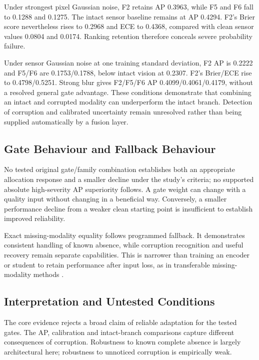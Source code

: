 Under strongest pixel Gaussian noise, F2 retains AP 0.3963, while F5 and F6 fall to
0.1288 and 0.1275. The intact sensor baseline remains at AP 0.4294. F2's Brier score
nevertheless rises to 0.2968 and ECE to 0.4368, compared with clean sensor values 0.0804
and 0.0174. Ranking retention therefore conceals severe probability failure.

Under sensor Gaussian noise at one training standard deviation, F2 AP is 0.2222 and
F5/F6 are 0.1753/0.1788, below intact vision at 0.2307. F2's Brier/ECE rise to
0.4798/0.5251. Strong blur gives F2/F5/F6 AP 0.4099/0.4061/0.4179, without a resolved
general gate advantage. These conditions demonstrate that combining an intact and
corrupted modality can underperform the intact branch. Detection of corruption and
calibrated uncertainty remain unresolved rather than being supplied automatically by a
fusion layer.

\subsection{Gate Behaviour and Fallback Behaviour}
No tested original gate/family combination establishes both an appropriate allocation
response and a smaller decline under the study's criteria; no supported absolute
high-severity AP superiority follows. A gate weight can change with a quality input
without changing in a beneficial way. Conversely, a smaller performance decline from a
weaker clean starting point is insufficient to establish improved reliability.

Exact missing-modality equality follows programmed fallback. It demonstrates consistent
handling of known absence, while corruption recognition and useful recovery remain
separate capabilities. This is narrower than training an encoder or student to retain
performance after input loss, as in transferable missing-modality methods
\citep{P005,P007,P016}.

\subsection{Interpretation and Untested Conditions}
The core evidence rejects a broad claim of reliable adaptation for the tested gates. The
AP, calibration and intact-branch comparisons capture different consequences of
corruption. Robustness to known complete absence is largely architectural here;
robustness to unnoticed corruption is empirically weak.

